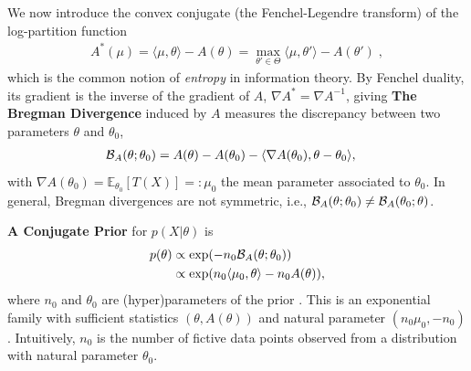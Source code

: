 \documentclass[twoside]{article}
\newcommand*{\expect}[2][]{\ensuremath{\mathbb{E}_{#1} \left[ #2 \right] }} %
\newcommand{\logpart}{A}
\newcommand{\conj}{\logpart^*}
\newcommand{\bregman}{\cB_\logpart}
\newcommand{\bregmanconj}{\cB_{\logpart^*}}
\newcommand{\nat}{\theta}
\newcommand{\m}{\mu}
\newcommand{\meanp}{\m}
\begin{document}
We now introduce the convex conjugate (the Fenchel-Legendre transform) of the log-partition function
\begin{align}
	\conj(\m) =  \langle \m, \nat \rangle - \logpart(\nat)
	=  \max_{\nat'\in\Theta}  \langle \m, \nat' \rangle - \logpart(\nat')\; ,
\end{align}
which is the common notion of \textit{entropy} in information theory.
By Fenchel duality, its gradient is the inverse of the gradient of $\logpart$,  $\nabla\conj=\nabla\logpart^{-1}$, giving
\aligns{
	\nabla\conj \circ \nabla\logpart(\nat) = \nat, \quad \nabla\logpart\circ \nabla\conj(\meanp) = \meanp.
}
%
{\bf The Bregman Divergence} induced by $\logpart$ measures the discrepancy between two parameters $\nat$ and $\nat_0$,
\begin{align}
    \bregman (\nat ; \nat_0)
    & = \logpart(\nat) - \logpart(\nat_0)
    - \langle \nabla \logpart(\nat_0)  , \nat - \nat_0 \rangle,
    \label{eq:defBregman}
\end{align}
with $\nabla \logpart(\nat_0) = \expect[\nat_0]{T(X)} =: \meanp_0$ the mean parameter associated to $\nat_0$.
In general, Bregman divergences are not symmetric, i.e., $\bregman (\nat ; \nat_0)\neq \bregman (\nat_0 ; \nat)$.

{\bf A Conjugate Prior} for $p(X|\nat)$ is
\begin{align}
    p(\nat)
    &\propto \exp( - n_0 \bregman(\nat ; \nat_0) ) \\
    &\propto \exp(n_0 \langle \m_0, \nat \rangle - n_0 \logpart(\nat)),
    \label{eq:def_prior}
\end{align}
where $n_0$ and $\nat_0$ are (hyper)parameters of the prior  \citep{agarwal2010geometric}.
This is an exponential family with sufficient statistics $(\nat ,\logpart(\nat))$ and natural parameter $(n_0 \m_0, -n_0)$.
Intuitively, $n_0$ is the number of fictive data points observed from a distribution with natural parameter $\nat_0$.
\end{document}
